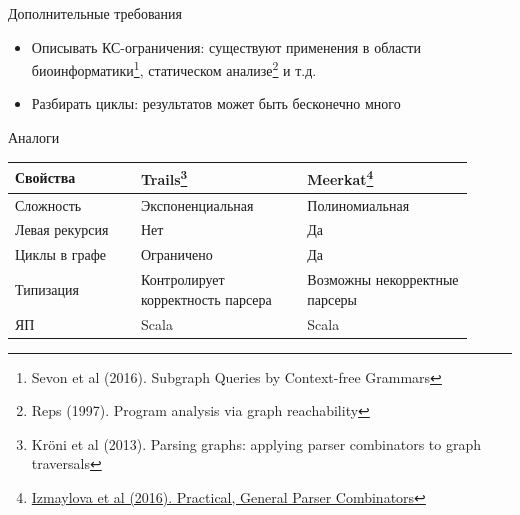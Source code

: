 \documentclass[aspectratio=169]{beamer}
\begin{document}
\begin{frame}[fragile]{Дополнительные требования}
  \begin{itemize}
    \item Описывать КС-ограничения: существуют применения в области биоинформатики\footnote[1]{Sevon et al (2016). Subgraph Queries by Context-free Grammars}, статическом анализе\footnote[2]{Reps (1997). Program analysis via graph reachability} и т.д.
    \item Разбирать циклы: результатов может быть бесконечно много
  \end{itemize}
  \begin{center}
  \end{center}
\end{frame}



\begin{frame}{Аналоги}
  \begin{table}[h]
    \renewcommand{\arraystretch}{1.3}
    \begin{tabular}{|b{0.25\linewidth}|b{0.33\linewidth}|b{0.33\linewidth}|}
      \hline
      \textbf{Свойства} & \textbf{Trails\footnote[1]{Kr\"{o}ni et al (2013). Parsing graphs: applying parser combinators to graph traversals}} & \textbf{Meerkat\footnote[2]{\href{https://dl.acm.org/doi/10.1145/2847538.2847539}
          {Izmaylova et al (2016). Practical, General Parser Combinators}}} \\
      \hline
      Сложность      & Экспоненциальная                  & Полиномиальная \\
      \hline
      Левая рекурсия & Нет                               & Да \\
      \hline
      Циклы в графе  & Ограничено                        & Да \\
      \hline
      Типизация      & Контролирует корректность парсера & Возможны некорректные парсеры \\
      \hline
      ЯП             & Scala                             & Scala \\
      \hline
    \end{tabular}
  \end{table}
\end{frame}
\end{document}
